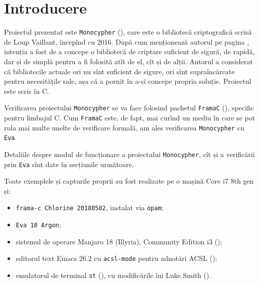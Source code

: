 \chapter*{Introducere}

\indent\indent Proiectul prezentat este \texttt{Monocypher} (\cite{gh1}), care este o bibliotecă
criptografică scrisă de Loup Vaillant, începînd cu 2016. După cum menționează
autorul pe pagina \cite{loupcrypto}, intenția a fost de a concepe o bibliotecă
de criptare suficient de sigură, de rapidă, dar și de simplă pentru a fi folosită
atît de el, cît și de alții. Autorul a considerat că bibliotecile actuale ori nu
sînt suficient de sigure, ori sînt supraîncărcate pentru necesitățile sale,
așa că a pornit în a-și concepe propria soluție. Proiectul este scris în C.

Verificarea proiectului \texttt{Monocypher} se va face folosind pachetul
\texttt{FramaC} (\cite{framac}), specific pentru limbajul C. Cum \texttt{FramaC}
este, de fapt, mai curînd un mediu în care se pot rula mai multe unelte de verificare
formală, am ales verificarea \texttt{Monocypher} cu \texttt{Eva}.

Detaliile despre modul de funcționare a proiectului \texttt{Monocypher}, cît și
a verificării prin \texttt{Eva} sînt date în secțiunile următoare.

\vspace{1cm}

Toate exemplele și capturile proprii au fost realizate pe o mașină Core i7 8th gen și:
\begin{itemize}
\item \texttt{frama-c Chlorine 20180502}, instalat via \texttt{opam};
\item \texttt{Eva 18 Argon};
\item sistemul de operare Manjaro 18 (Illyria), Community Edition i3 (\cite{mi3});
\item editorul text Emacs 26.2 \cite{emacs} cu \texttt{acsl-mode} pentru adnotări ACSL (\cite{acsl-mode});
\item emulatorul de terminal \texttt{st} (\cite{st}), cu modificările lui Luke Smith
  (\cite{lukest}).
\end{itemize}

